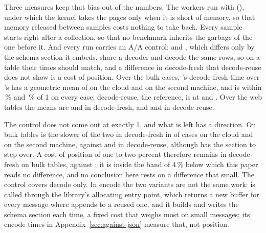 Three measures keep that bias out of the numbers. The workers run with
 (), under which the kernel
takes the pages only when it is short of memory, so that memory released
between samples costs nothing to take back. Every sample starts right after
a collection, so that no benchmark inherits the garbage of the one before
it. And every run carries an A/A control: \colbin{} and ,
which differs only by the schema section it embeds, share a decoder and
decode the same rows, so on a table their times should match, and a
difference in decode-fresh that decode-reuse does not show is a cost of
position. Over
the  bulk cases, \colbin{}'s
decode-fresh time over 's has a geometric mean of
 on the cloud and
 on the second machine, and
is within \,\% and
\,\% of 1 on every case;
decode-reuse, the reference, is at
 and
. Over the
 web tables the means are
 and
 in decode-fresh, and
 and
 in decode-reuse.

The control does not come out at exactly 1, and what is left has a
direction. On bulk tables \colbin{} is the slower of the two in decode-fresh
in  of
 cases on the cloud and
 on the second machine,
against  and
 in decode-reuse, although
 has the section to step over. A cost of position of one
to two percent therefore remains in decode-fresh on bulk tables, against
\colbin{}; it is inside the band of 4\,\% below which this paper reads no
difference, and no conclusion here rests on a difference that small. The
control covers decode only. In encode the two variants are not the same
work:  is called through the library's allocating entry
point, which returns a new buffer for every message where \colbin{} appends
to a reused one, and it builds and writes the schema section each time, a
fixed cost that weighs most on small messages; its encode times in
Appendix~\ref{sec:against-json} measure that, not position.

